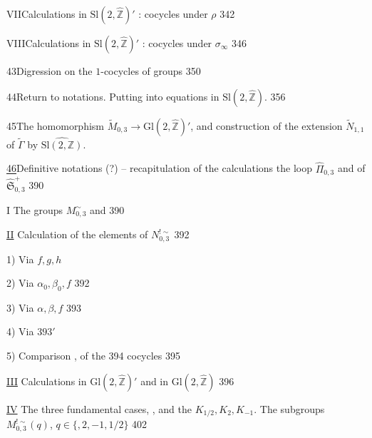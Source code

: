 VII\quad Calculations in $\mathrm{Sl}(2,\widehat{\mathbb Z})'$ :
cocycles under $\rho$
\hfill 342

VIII\quad Calculations in $\mathrm{Sl}(2,\widehat{\mathbb Z})'$ :
cocycles under $\sigma_\infty$
\hfill 346


43\quad Digression on the $1$-cocycles of  groups
\hfill 350

44\quad Return to notations.
Putting into equations in $\mathrm{Sl}(2,\widehat{\mathbb Z})$.
\hfill 356

45\quad The homomorphism
$\widetilde{M}_{0,3}\longrightarrow \mathrm{Gl}(2,\widehat{\mathbb Z})'$,
and construction of the extension $\widetilde{N}_{1,1}$
of $\widetilde{\Gamma}$ by $\widehat{\mathrm{Sl}(2,\mathbb Z)}$.
\hfill {}

\uline{46}\quad Definitive notations (?) -- recapitulation
of the calculations  the loop 
 $\widehat{\Pi}_{0,3}$ and of
$\widehat{\mathfrak S}_{0,3}^{+}$
\hfill 390



I The groups \(M_{0,3}^{\sim}\) and  \hfill 390

\uline{II} Calculation of the elements of \(N_{0,3}^{!\sim}\) \hfill 392

1) Via \(f,g,h\)

2) Via \(\alpha_0,\beta_0,f\) \hfill 392

3) Via \(\alpha,\beta,f\) \hfill 393

4) Via  \hfill \(393'\)

5) Comparison  ,  of the \hfill 394
cocycles \hfill 395

\uline{III} Calculations in \(\mathrm{Gl}(2,\widehat{\mathbb Z})'\) and in \(\mathrm{Gl}(2,\widehat{\mathbb Z})\) \hfill 396

\uline{IV} The three fundamental cases, 
, and the 
\(K_{1/2},K_2,K_{-1}\). The subgroups \(M_{0,3}^{!\sim}(q)\),
\(q\in\{\)\(,2,-1,1/2\}\)
\hfill {} 402

